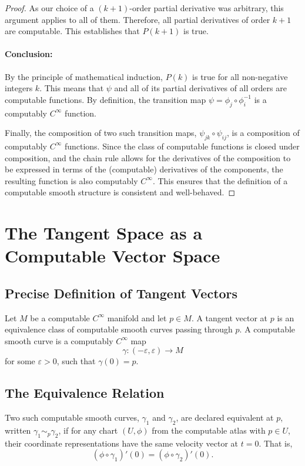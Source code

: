 \documentclass[12pt, a4paper]{article}
\begin{document}
\begin{proof}
As our choice of a $(k+1)$-order partial derivative was arbitrary, this argument applies to all of them. Therefore, all partial derivatives of order $k+1$ are computable. This establishes that $P(k+1)$ is true.

\paragraph{Conclusion:} By the principle of mathematical induction, $P(k)$ is true for all non-negative integers $k$. This means that $\psi$ and all of its partial derivatives of all orders are computable functions. By definition, the transition map $\psi = \phi_j \circ \phi_i^{-1}$ is a computably $C^\infty$ function.

Finally, the composition of two such transition maps, $\psi_{jk} \circ \psi_{ij}$, is a composition of computably $C^\infty$ functions. Since the class of computable functions is closed under composition, and the chain rule allows for the derivatives of the composition to be expressed in terms of the (computable) derivatives of the components, the resulting function is also computably $C^\infty$. This ensures that the definition of a computable smooth structure is consistent and well-behaved.
\end{proof}

\section*{The Tangent Space as a Computable Vector Space}

\subsection*{Precise Definition of Tangent Vectors}

Let $M$ be a computable $C^\infty$ manifold and let $p \in M$. A tangent vector at $p$ is an equivalence class of computable smooth curves passing through $p$. A computable smooth curve is a computably $C^\infty$ map
\[
\gamma : (-\varepsilon, \varepsilon) \to M
\]
for some $\varepsilon > 0$, such that $\gamma(0) = p$.

\subsection*{The Equivalence Relation}

Two such computable smooth curves, $\gamma_1$ and $\gamma_2$, are declared equivalent at $p$, written $\gamma_1 \sim_p \gamma_2$, if for any chart $(U, \phi)$ from the computable atlas with $p \in U$, their coordinate representations have the same velocity vector at $t=0$. That is,
\[
(\phi \circ \gamma_1)'(0) = (\phi \circ \gamma_2)'(0).
\]
\end{document}
